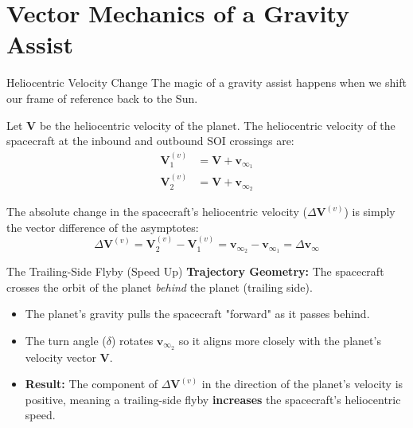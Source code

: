 \documentclass[11pt]{beamer}
\begin{document}
\section{Vector Mechanics of a Gravity Assist}

\begin{frame}{Heliocentric Velocity Change}
    The magic of a gravity assist happens when we shift our frame of reference back to the Sun. 
    
    \vspace{0.3cm}
    Let $\bm{V}$ be the heliocentric velocity of the planet. The heliocentric velocity of the spacecraft at the inbound and outbound SOI crossings are:
    \begin{align}
        \bm{V}_1^{(v)} &= \bm{V} + \bm{v}_{\infty_1} \\
        \bm{V}_2^{(v)} &= \bm{V} + \bm{v}_{\infty_2}
    \end{align}
   
    
    The absolute change in the spacecraft's heliocentric velocity ($\Delta \bm{V}^{(v)}$) is simply the vector difference of the asymptotes:
    \begin{equation}
        \Delta \bm{V}^{(v)} = \bm{V}_2^{(v)} - \bm{V}_1^{(v)} = \bm{v}_{\infty_2} - \bm{v}_{\infty_1} = \Delta \bm{v}_\infty
    \end{equation}
   
\end{frame}

\begin{frame}{The Trailing-Side Flyby (Speed Up)}
    \textbf{Trajectory Geometry:} The spacecraft crosses the orbit of the planet \textit{behind} the planet (trailing side).
    
    \vspace{0.2cm}
    \begin{itemize}
        \item The planet's gravity pulls the spacecraft "forward" as it passes behind.
        \item The turn angle ($\delta$) rotates $\bm{v}_{\infty_2}$ so it aligns more closely with the planet's velocity vector $\bm{V}$.
        \item \textbf{Result:} The component of $\Delta \bm{V}^{(v)}$ in the direction of the planet's velocity is positive, meaning a trailing-side flyby \textbf{increases} the spacecraft's heliocentric speed.
    \end{itemize}
\end{frame}
\end{document}
